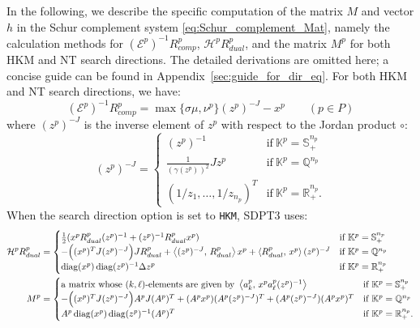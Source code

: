 In the following, we describe the specific computation of the matrix $M$ and vector $h$ in the Schur complement system \eqref{eq:Schur_complement_Mat}, namely the calculation methods for $(\mathcal{E}^p)^{-1}R^p_{comp}$, $\mathcal{H}^p R^p_{dual}$, and the matrix $M^p$ for both HKM and NT search directions. 
The detailed derivations are omitted here; a concise guide can be found in Appendix~\ref{sec:guide_for_dir_eq}. 
For both HKM and NT search directions, we have:
\begin{equation}
    (\mathcal{E}^p)^{-1}R^p_{comp} = \max\{\sigma\mu, \nu^p\}(z^p)^{-J} - x^p \qquad (p \in P)
    \label{eq:Einv_Rcomp}
\end{equation}
where $(z^p)^{-J}$ is the inverse element of $z^p$ with respect to the Jordan product $\circ$:
\[
    (z^p)^{-J} = \begin{cases}
        (z^p)^{-1} & \text{if} ~ \mathbb{K}^p=\mathbb{S}^{n_p}_+ \\
        \frac{1}{(\gamma(z^p))^2} J z^p & \text{if} ~ \mathbb{K}^p=\mathbb{Q}^{n_p} \\
        (1/z_1, \ldots, 1/z_{n_p})^T & \text{if} ~ \mathbb{K}^p=\mathbb{R}^{n_p}_+.
    \end{cases}
\]
When the search direction option is set to \texttt{HKM}, SDPT3 uses:
\begin{align}
    \mathcal{H}^p R^p_{dual} &= \begin{cases}
        \frac{1}{2}(x^p R^p_{dual} (z^p)^{-1} + (z^p)^{-1} R^p_{dual} x^p) & \text{if} ~ \mathbb{K}^p=\mathbb{S}^{n_p}_+\\
        - \Big( (x^p)^T J (z^p)^{-J} \Big) J R^p_{dual} + \left\langle (z^p)^{-J}, \, R^p_{dual} \right\rangle x^p + \left\langle R^p_{dual}, \, x^p \right\rangle (z^p)^{-J} & \text{if} ~ \mathbb{K}^p=\mathbb{Q}^{n_p}\\
        \operatorname{diag}(x^p) \operatorname{diag}(z^p)^{-1} \Delta z^p & \text{if} ~ \mathbb{K}^p=\mathbb{R}^{n_p}_+
    \end{cases} \label{eq:HKM_HRd}\\
    M^p &= \begin{cases} 
        \text{a matrix whose $(k,\ell)$-elements are given by } \left\langle a^p_k, \, x^p a^p_\ell (z^p)^{-1} \right\rangle & \text{if} ~ \mathbb{K}^p=\mathbb{S}^{n_p}_+ \\
        -\Big( (x^p)^T J (z^p)^{-J} \Big) A^p J (A^p)^T + (A^p x^p)(A^p (z^p)^{-J})^T + (A^p (z^p)^{-J})(A^p x^p)^T& \text{if} ~ \mathbb{K}^p=\mathbb{Q}^{n_p} \\
        A^p \operatorname{diag}(x^p) \operatorname{diag}(z^p)^{-1} (A^p)^T & \text{if} ~ \mathbb{K}^p=\mathbb{R}^{n_p}_+.
    \end{cases}
\end{align}

